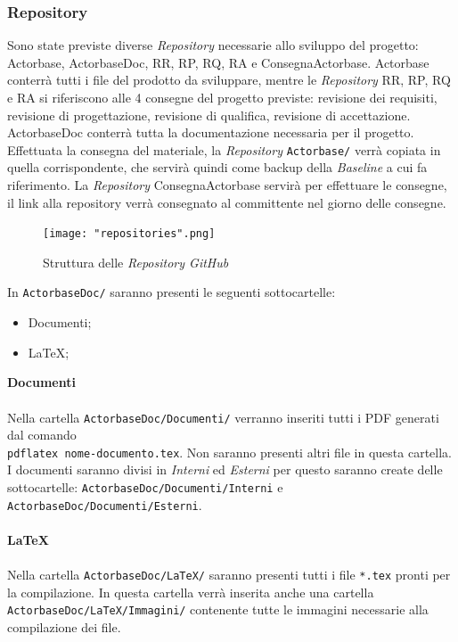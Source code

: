 \documentclass[a4paper]{article}
\begin{document}
		\subsubsection{Repository}
	Sono state previste diverse \emph{Repository} necessarie allo sviluppo del progetto: Actorbase, ActorbaseDoc, RR, RP, RQ, RA e ConsegnaActorbase. 	
    Actorbase conterrà tutti i file del prodotto da sviluppare, mentre le \emph{Repository} RR, RP, RQ e RA si riferiscono alle 4 consegne del 
    progetto previste: revisione dei requisiti, revisione di progettazione, revisione di qualifica, revisione di accettazione.
    ActorbaseDoc conterrà tutta la documentazione necessaria per il progetto.  
    Effettuata la consegna del materiale, la \emph{Repository} \verb|Actorbase/| verrà copiata in quella corrispondente, che servirà quindi come 
    backup della \emph{Baseline} a cui fa riferimento.
    La \emph{Repository} ConsegnaActorbase servirà per effettuare le consegne, il link alla repository verrà consegnato al committente nel giorno delle 
    consegne.
  	\begin{figure}[H]
		\centering
		\texttt{[image: "repositories".png]}
		\caption{Struttura delle \emph{Repository GitHub}}
	\end{figure}
	In \verb|ActorbaseDoc/| saranno presenti le seguenti sottocartelle:
	\begin{itemize}
		\item Documenti;
		\item LaTeX;
	\end{itemize}
	\textbf{Documenti} \\ \\
	Nella cartella \verb|ActorbaseDoc/Documenti/| verranno inseriti tutti i PDF generati dal comando \\ \verb|pdflatex nome-documento.tex|. Non
	saranno presenti altri file in questa cartella. I documenti saranno divisi in \emph{Interni} ed \emph{Esterni} per questo saranno create 
    delle sottocartelle: \verb|ActorbaseDoc/Documenti/Interni| e \verb|ActorbaseDoc/Documenti/Esterni|.
	\\ \\
    \textbf{LaTeX} \\ \\
	Nella cartella \verb|ActorbaseDoc/LaTeX/| saranno presenti tutti i file \verb|*.tex| pronti per la compilazione. In questa cartella verrà inserita
	anche una cartella\\ \verb|ActorbaseDoc/LaTeX/Immagini/| contenente tutte le immagini necessarie alla compilazione dei file.
\end{document}

